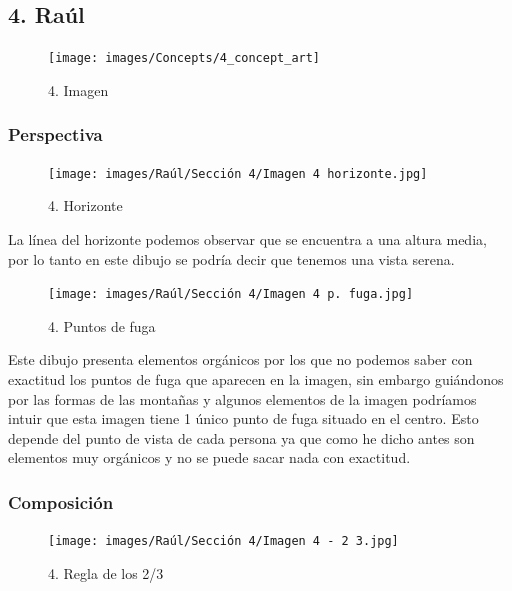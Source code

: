 \documentclass[12pt]{article}
\begin{document}

    \subsection{4. Raúl}
    
    \begin{figure}[H]
      \centering
      \texttt{[image: images/Concepts/4\_concept\_art]}
      \caption{\small 4. Imagen}
\end{figure}

        \subsubsection{Perspectiva}
        
  \begin{figure}[H]
      \centering
      \texttt{[image: images/Raúl/Sección 4/Imagen 4 horizonte.jpg]}
      \caption{\small 4. Horizonte}
\end{figure}       

La línea del horizonte podemos observar que se encuentra a una altura media, por lo tanto en este dibujo se podría decir que tenemos una vista serena.

\begin{figure}[H]
      \centering
      \texttt{[image: images/Raúl/Sección 4/Imagen 4 p. fuga.jpg]}
      \caption{\small 4. Puntos de fuga}
\end{figure}  

Este dibujo presenta elementos orgánicos por los que no podemos saber con exactitud los puntos de fuga que aparecen en la imagen, sin embargo guiándonos por las formas de las montañas y algunos elementos de la imagen podríamos intuir que esta imagen tiene 1 único punto de fuga situado en el centro. Esto depende del punto de vista de cada persona ya que como he dicho antes son elementos muy orgánicos y no se puede sacar nada con exactitud.

        \subsubsection{Composición}
        
\begin{figure}[H]
      \centering
      \texttt{[image: images/Raúl/Sección 4/Imagen 4 - 2 3.jpg]}
      \caption{\small 4. Regla de los 2/3}
\end{figure}  
\end{document}
